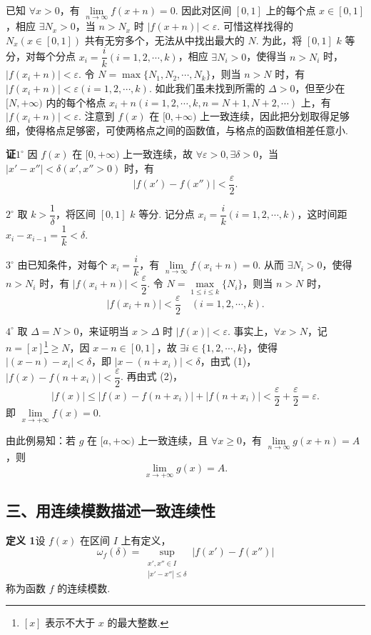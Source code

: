 \documentclass[UTF8, 12pt, fontset=fandol, oneside]{ctexart}
\begin{document}
已知 $\forall x>0$，有 $\lim\limits_{n\to\infty}f(x+n)=0$. 因此对区间 $[0,1]$ 上的每个点 $x\in[0,1]$，相应 $\exists N_x>0$，当 $n>N_x$ 时 $|f(x+n)|<\varepsilon$. 可惜这样找得的 $N_x(x\in[0,1])$ 共有无穷多个，无法从中找出最大的 $N$. 为此，将 $[0,1]$ $k$ 等分，对每个分点 $x_i=\dfrac ik(i=1,2,\cdots,k)$，相应 $\exists N_i>0$，使得当 $n>N_i$ 时，$|f(x_i+n)|<\varepsilon$. 令 $N=\max\{N_1,N_2,\cdots,N_k\}$，则当 $n>N$ 时，有 $|f(x_i+n)|<\varepsilon(i=1,2,\cdots,k)$. 如此我们虽未找到所需的 $\Delta>0$，但至少在 $[N,+\infty)$ 内的每个格点 $x_i+n(i=1,2,\cdots,k,n=N+1,N+2,\cdots)$ 上，有 $|f(x_i+n)|<\varepsilon$. 注意到 $f(x)$ 在 $[0,+\infty)$ 上一致连续，因此把分划取得足够细，使得格点足够密，可使两格点之间的函数值，与格点的函数值相差任意小.

\noindent\textbf{证}\quad $1^\circ$ 因 $f(x)$ 在 $[0,+\infty)$ 上一致连续，故 $\forall\varepsilon>0,\exists\delta>0$，当 $|x'-x''|<\delta(x',x''>0)$ 时，有
\[
  |f(x')-f(x'')|<\frac\varepsilon2. \tag{1}
\]

$2^\circ$ 取 $k>\dfrac1\delta$，将区间 $[0,1]$ $k$ 等分. 记分点 $x_i=\dfrac ik(i=1,2,\cdots,k)$，这时间距 $x_i-x_{i-1}=\dfrac1k<\delta$.

$3^\circ$ 由已知条件，对每个 $x_i=\dfrac ik$，有 $\lim\limits_{n\to\infty}f(x_i+n)=0$. 从而 $\exists N_i>0$，使得 $n>N_i$ 时，有 $|f(x_i+n)|<\dfrac\varepsilon2$. 令 $N=\max\limits_{1\le i\le k}\{N_i\}$，则当 $n>N$ 时，
\[
  |f(x_i+n)|<\frac\varepsilon2\quad(i=1,2,\cdots,k). \tag{2}
\]

$4^\circ$ 取 $\Delta=N>0$，来证明当 $x>\Delta$ 时 $|f(x)|<\varepsilon$. 事实上，$\forall x>N$，记 $n=[x]$\footnote{$[x]$ 表示不大于 $x$ 的最大整数.}$\ge N$，因 $x-n\in[0,1]$，故 $\exists i\in\{1,2,\cdots,k\}$，使得 $|(x-n)-x_i|<\delta$，即 $|x-(n+x_i)|<\delta$，由式 (1)，$|f(x)-f(n+x_i)|<\dfrac\varepsilon2$. 再由式 (2)，
\[
  |f(x)|\le |f(x)-f(n+x_i)|+|f(n+x_i)|<\frac\varepsilon2+\frac\varepsilon2=\varepsilon.
\]
即 $\lim\limits_{x\to+\infty}f(x)=0$.

由此例易知：若 $g$ 在 $[a,+\infty)$ 上一致连续，且 $\forall x\ge0$，有 $\lim\limits_{n\to\infty}g(x+n)=A$，则
\[
  \lim_{x\to+\infty}g(x)=A.
\]

\subsection*{三、用连续模数描述一致连续性}

\noindent\textbf{定义 1}\quad 设 $f(x)$ 在区间 $I$ 上有定义，
\[
  \omega_f(\delta)=\sup_{\substack{x',x''\in I\\ |x'-x''|\le\delta}}|f(x')-f(x'')|
\]
称为函数 $f$ 的连续模数.
\end{document}

